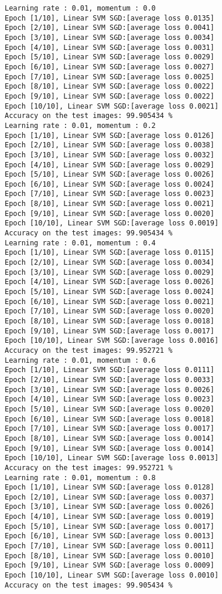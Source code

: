 \documentclass[10pt]{article}
\newcommand{\0}{{\mathbf{0}}}
\newcommand{\1}{{\mathbf{1}}}
\begin{document}
\begin{verbatim}
Learning rate : 0.01, momentum : 0.0
Epoch [1/10], Linear SVM SGD:[average loss 0.0135]
Epoch [2/10], Linear SVM SGD:[average loss 0.0041]
Epoch [3/10], Linear SVM SGD:[average loss 0.0034]
Epoch [4/10], Linear SVM SGD:[average loss 0.0031]
Epoch [5/10], Linear SVM SGD:[average loss 0.0029]
Epoch [6/10], Linear SVM SGD:[average loss 0.0027]
Epoch [7/10], Linear SVM SGD:[average loss 0.0025]
Epoch [8/10], Linear SVM SGD:[average loss 0.0022]
Epoch [9/10], Linear SVM SGD:[average loss 0.0022]
Epoch [10/10], Linear SVM SGD:[average loss 0.0021]
Accuracy on the test images: 99.905434 %
Learning rate : 0.01, momentum : 0.2
Epoch [1/10], Linear SVM SGD:[average loss 0.0126]
Epoch [2/10], Linear SVM SGD:[average loss 0.0038]
Epoch [3/10], Linear SVM SGD:[average loss 0.0032]
Epoch [4/10], Linear SVM SGD:[average loss 0.0029]
Epoch [5/10], Linear SVM SGD:[average loss 0.0026]
Epoch [6/10], Linear SVM SGD:[average loss 0.0024]
Epoch [7/10], Linear SVM SGD:[average loss 0.0023]
Epoch [8/10], Linear SVM SGD:[average loss 0.0021]
Epoch [9/10], Linear SVM SGD:[average loss 0.0020]
Epoch [10/10], Linear SVM SGD:[average loss 0.0019]
Accuracy on the test images: 99.905434 %
Learning rate : 0.01, momentum : 0.4
Epoch [1/10], Linear SVM SGD:[average loss 0.0115]
Epoch [2/10], Linear SVM SGD:[average loss 0.0034]
Epoch [3/10], Linear SVM SGD:[average loss 0.0029]
Epoch [4/10], Linear SVM SGD:[average loss 0.0026]
Epoch [5/10], Linear SVM SGD:[average loss 0.0024]
Epoch [6/10], Linear SVM SGD:[average loss 0.0021]
Epoch [7/10], Linear SVM SGD:[average loss 0.0020]
Epoch [8/10], Linear SVM SGD:[average loss 0.0018]
Epoch [9/10], Linear SVM SGD:[average loss 0.0017]
Epoch [10/10], Linear SVM SGD:[average loss 0.0016]
Accuracy on the test images: 99.952721 %
Learning rate : 0.01, momentum : 0.6
Epoch [1/10], Linear SVM SGD:[average loss 0.0111]
Epoch [2/10], Linear SVM SGD:[average loss 0.0033]
Epoch [3/10], Linear SVM SGD:[average loss 0.0026]
Epoch [4/10], Linear SVM SGD:[average loss 0.0023]
Epoch [5/10], Linear SVM SGD:[average loss 0.0020]
Epoch [6/10], Linear SVM SGD:[average loss 0.0018]
Epoch [7/10], Linear SVM SGD:[average loss 0.0017]
Epoch [8/10], Linear SVM SGD:[average loss 0.0014]
Epoch [9/10], Linear SVM SGD:[average loss 0.0014]
Epoch [10/10], Linear SVM SGD:[average loss 0.0013]
Accuracy on the test images: 99.952721 %
Learning rate : 0.01, momentum : 0.8
Epoch [1/10], Linear SVM SGD:[average loss 0.0128]
Epoch [2/10], Linear SVM SGD:[average loss 0.0037]
Epoch [3/10], Linear SVM SGD:[average loss 0.0026]
Epoch [4/10], Linear SVM SGD:[average loss 0.0019]
Epoch [5/10], Linear SVM SGD:[average loss 0.0017]
Epoch [6/10], Linear SVM SGD:[average loss 0.0013]
Epoch [7/10], Linear SVM SGD:[average loss 0.0011]
Epoch [8/10], Linear SVM SGD:[average loss 0.0010]
Epoch [9/10], Linear SVM SGD:[average loss 0.0009]
Epoch [10/10], Linear SVM SGD:[average loss 0.0010]
Accuracy on the test images: 99.905434 %
\end{verbatim}
\end{document}
